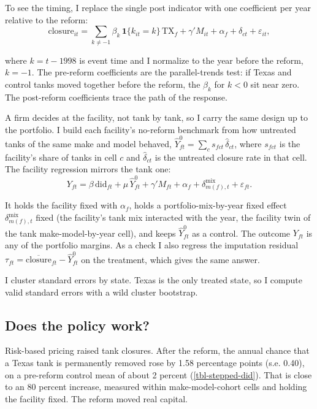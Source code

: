 \documentclass[
  12pt,
]{article}
\begin{document}
To see the timing, I replace the single post indicator with one
coefficient per year relative to the reform: \[
\text{closure}_{it}=\sum_{k\ne -1}\beta_k\,\mathbf 1\{k_{it}=k\}\,\text{TX}_f+\gamma'M_{it}+\alpha_f+\delta_{ct}+\varepsilon_{it},
\]

where \(k=t-1998\) is event time and I normalize to the year before the
reform, \(k=-1\). The pre-reform coefficients are the parallel-trends
test: if Texas and control tanks moved together before the reform, the
\(\beta_k\) for \(k<0\) sit near zero. The post-reform coefficients
trace the path of the response.

A firm decides at the facility, not tank by tank, so I carry the same
design up to the portfolio. I build each facility's no-reform benchmark
from how untreated tanks of the same make and model behaved,
\(\hat Y^0_{ft}=\sum_c s_{fct}\,\hat\delta_{ct}\), where \(s_{fct}\) is
the facility's share of tanks in cell \(c\) and \(\hat\delta_{ct}\) is
the untreated closure rate in that cell. The facility regression mirrors
the tank one: \[
Y_{ft}=\beta\,\text{did}_{ft}+\mu\,\hat Y^0_{ft}+\gamma'M_{ft}+\alpha_f+\delta^{\text{mix}}_{m(f),t}+\varepsilon_{ft}.
\]

It holds the facility fixed with \(\alpha_f\), holds a
portfolio-mix-by-year fixed effect \(\delta^{\text{mix}}_{m(f),t}\)
fixed (the facility's tank mix interacted with the year, the facility
twin of the tank make-model-by-year cell), and keeps \(\hat Y^0_{ft}\)
as a control. The outcome \(Y_{ft}\) is any of the portfolio margins. As
a check I also regress the imputation residual
\(\tau_{ft}=\overline{\text{closure}}_{ft}-\hat Y^0_{ft}\) on the
treatment, which gives the same answer.

I cluster standard errors by state. Texas is the only treated state, so
I compute valid standard errors with a wild cluster bootstrap.

\subsection{Does the policy work?}\label{does-the-policy-work}

Risk-based pricing raised tank closures. After the reform, the annual
chance that a Texas tank is permanently removed rose by 1.58 percentage
points (s.e. 0.40), on a pre-reform control mean of about 2 percent
(\autoref{tbl-stepped-did}). That is close to an 80 percent increase,
measured within make-model-cohort cells and holding the facility fixed.
The reform moved real capital.
\end{document}
